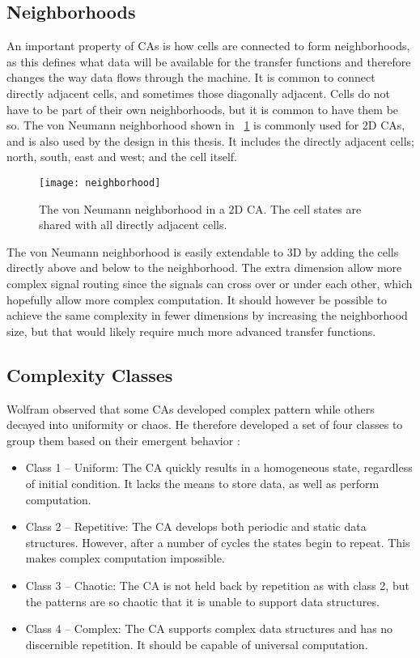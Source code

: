 \subsection{Neighborhoods}

An important property of CAs is how cells are connected to form neighborhoods, as this defines what data will be available for the transfer functions and therefore changes the way data flows through the machine.
It is common to connect directly adjacent cells, and sometimes those diagonally adjacent.
Cells do not have to be part of their own neighborhoods, but it is common to have them be so.
The von Neumann neighborhood shown in \figurename~\ref{fig:neighborhood} is commonly used for 2D CAs, and is also used by the design in this thesis.
It includes the directly adjacent cells; north, south, east and west; and the cell itself.

\begin{figure}[!ht]
    \centering
    \texttt{[image: neighborhood]}
    \caption[von Neumann Neighborhood]{
        The von Neumann neighborhood in a 2D CA.
        The cell states are shared with all directly adjacent cells.
    }
    \label{fig:neighborhood}
\end{figure}

The von Neumann neighborhood is easily extendable to 3D by adding the cells directly above and below to the neighborhood.
The extra dimension allow more complex signal routing since the signals can cross over or under each other, which hopefully allow more complex computation.
It should however be possible to achieve the same complexity in fewer dimensions by increasing the neighborhood size, but that would likely require much more advanced transfer functions.

\subsection{Complexity Classes}

Wolfram observed that some CAs developed complex pattern while others decayed into uniformity or chaos.
He therefore developed a set of four classes to group them based on their emergent behavior \cite{wolfram1984complexity}:

\begin{itemize}
    \item Class 1 – Uniform:
        The CA quickly results in a homogeneous state, regardless of initial condition.
        It lacks the means to store data, as well as perform computation.
    \item Class 2 – Repetitive:
        The CA develops both periodic and static data structures.
        However, after a number of cycles the states begin to repeat.
        This makes complex computation impossible.
    \item Class 3 – Chaotic:
        The CA is not held back by repetition as with class 2, but the patterns are so chaotic that it is unable to support data structures.
    \item Class 4 – Complex:
        The CA supports complex data structures and has no discernible repetition.
        It should be capable of universal computation.
\end{itemize}

